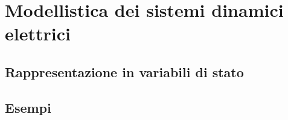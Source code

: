 \documentclass[../main.tex]{subfiles}
\begin{document}
\clearpage
\thispagestyle{empty}

\vspace*{7cm}
\section{Modellistica dei sistemi dinamici elettrici}
\vspace*{1.5cm}






\subsection{Rappresentazione in variabili di stato}

\subsection{Esempi}
\end{document}

